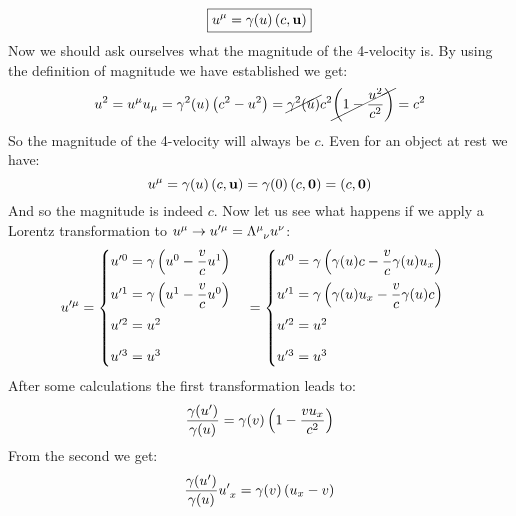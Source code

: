 \begin{equation}
  \boxed{u^{\mu} = \gamma(u) \left(c, \vb{u}\right)}
\end{equation}
Now we should ask ourselves what the magnitude of the 4-velocity is. By using the definition of magnitude we have established we get:
\begin{equation}
  u^2 = u^{\mu}u_{\mu} = \gamma^2(u)\left(c^2 - u^2\right) = \cancel{\gamma^2(u)}c^2\cancel{\left(1 - \dfrac{u^2}{c^2}\right)} = c^2
\end{equation}
So the magnitude of the 4-velocity will always be $c$. Even for an object at rest we have:
\begin{equation}
  u^{\mu} = \gamma(u)\left(c, \vb{u}\right) = \gamma(0)\left(c, \vb{0}\right) = \left(c, \vb{0}\right)
\end{equation}
And so the magnitude is indeed $c$. Now let us see what happens if we apply a Lorentz transformation to $\tensor{u}{^\mu} \rightarrow \tensor{u}{^\prime^\mu} = \tensor{\lm}{^\mu_\nu}\tensor{u}{^\nu}$:
\begin{equation}
  \tensor{u}{^\prime^\mu} =
  \begin{cases}
    \tensor{u}{^\prime^0} = \gamma \left( u^{0} - \dfrac{v}{c} u^{1} \right) \\[8pt]
    \tensor{u}{^\prime^1} = \gamma \left( u^{1} -  \dfrac{v}{c} u^{0}\right) \\[8pt]
    \tensor{u}{^\prime^2} = u^{2} \\[8pt]
    \tensor{u}{^\prime^3} = u^{3}
  \end{cases} =
  \begin{cases}
    \tensor{u}{^\prime^0} = \gamma \left( \gamma(u)c - \dfrac{v}{c} \gamma(u)u_x \right) \\[8pt]
    \tensor{u}{^\prime^1} = \gamma \left( \gamma(u)u_x -  \dfrac{v}{c} \gamma(u)c \right) \\[8pt]
    \tensor{u}{^\prime^2} = u^{2} \\[8pt]
    \tensor{u}{^\prime^3} = u^{3}
  \end{cases}
\end{equation}
After some calculations the first transformation leads to:
\begin{equation} \label{gamma_transformation}
  \dfrac{\gamma(u')}{\gamma(u)} = \gamma(v)\left(1-\dfrac{v u_x}{c^2}\right)
\end{equation}
From the second we get:
\begin{equation}
  \dfrac{\gamma(u')}{\gamma(u)}\tensor{u}{^\prime_x} = \gamma(v)\brackets{u_x - v}
\end{equation}
